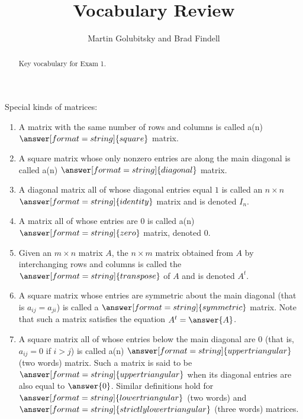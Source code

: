\documentclass{ximera}
\title{Vocabulary Review}
\author{Martin Golubitsky and Brad Findell}
\begin{document}
\begin{abstract}
Key vocabulary for Exam 1.
\end{abstract}
\maketitle


\begin{question}
Special kinds of matrices:  
\begin{enumerate}

\item A matrix with the same number of rows and columns is called a(n) $\answer[format=string]{square}$ matrix. 

\item A square matrix whose only nonzero entries are along the main diagonal is called a(n) $\answer[format=string]{diagonal}$ matrix. 

\item A diagonal matrix all of whose diagonal entries equal $1$ is called an $n\times n$ $\answer[format=string]{identity}$ matrix and is denoted $I_n$.  

\item A matrix all of whose entries are $0$ is called a(n) $\answer[format=string]{zero}$ matrix, denoted $0$.  

\item Given an $m\times n$ matrix $A$, the $n\times m$ matrix obtained from $A$ by interchanging rows and columns is called 
the $\answer[format=string]{transpose}$ of $A$ and is denoted $A^t$.  

\item A square matrix whose entries are symmetric about the main diagonal (that is $a_{ij}=a_{ji}$) is called a $\answer[format=string]{symmetric}$ matrix.  
Note that such a matrix satisfies the equation $A^t=\answer{A}$.

\item A square matrix all of whose entries below the main diagonal are $0$ (that is, $a_{ij}=0$ if $i>j$) 
is called a(n) $\answer[format=string]{upper triangular}$ (two words) matrix.  
Such a matrix is said to be 
$\answer[format=string]{upper triangular}$ when its diagonal entries are also equal to $\answer{0}$.  Similar
definitions hold for $\answer[format=string]{lower triangular}$ (two words)
and $\answer[format=string]{strictly lower triangular}$ (three words) matrices.  

\end{enumerate}
\end{question}
\end{document}
